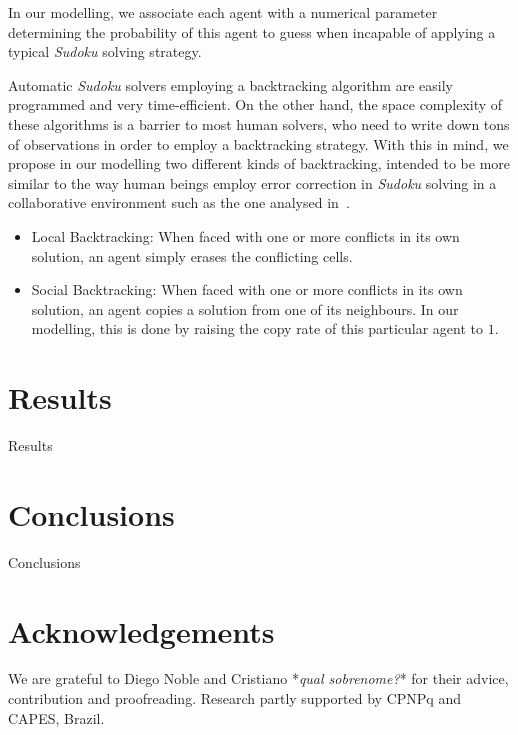 \documentclass[letterpaper]{article}
\begin{document}
In our modelling, we associate each agent with a numerical parameter determining the probability of this agent to guess when incapable of applying a typical {\em Sudoku} solving strategy.

Automatic {\em Sudoku} solvers employing a backtracking algorithm are easily programmed and very time-efficient. On the other hand, the space complexity of these algorithms is a barrier to most human solvers, who need to write down tons of observations in order to employ a backtracking strategy. With this in mind, we propose in our modelling two different kinds of backtracking, intended to be more similar to the way human beings employ error correction in {\em Sudoku} solving in a collaborative environment such as the one analysed in~\cite{farenzena:collabem}.

\begin{itemize}

\item
Local Backtracking: When faced with one or more conflicts in its own solution, an agent simply erases the conflicting cells.
\item
Social Backtracking: When faced with one or more conflicts in its own solution, an agent copies a solution from one of its neighbours. In our modelling, this is done by raising the copy rate of this particular agent to $1$.

\end{itemize}


\section{Results}

Results

\section{Conclusions}

Conclusions

\section{Acknowledgements}

We are grateful to Diego Noble and Cristiano *{\em qual sobrenome?}* for their advice, contribution and proofreading. Research partly supported by CPNPq and CAPES, Brazil.



\end{document}
